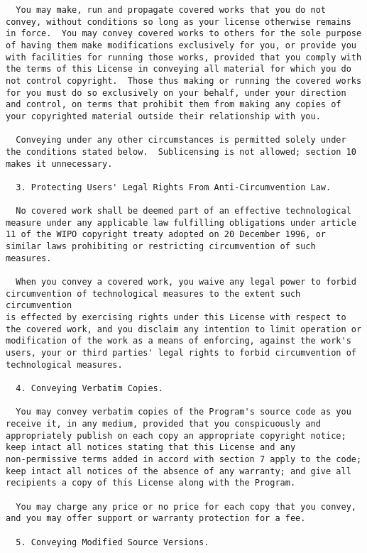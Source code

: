 \documentclass[11pt]{article}
\begin{document}
\begin{verbatim}
  You may make, run and propagate covered works that you do not
convey, without conditions so long as your license otherwise remains
in force.  You may convey covered works to others for the sole purpose
of having them make modifications exclusively for you, or provide you
with facilities for running those works, provided that you comply with
the terms of this License in conveying all material for which you do
not control copyright.  Those thus making or running the covered works
for you must do so exclusively on your behalf, under your direction
and control, on terms that prohibit them from making any copies of
your copyrighted material outside their relationship with you.

  Conveying under any other circumstances is permitted solely under
the conditions stated below.  Sublicensing is not allowed; section 10
makes it unnecessary.

  3. Protecting Users' Legal Rights From Anti-Circumvention Law.

  No covered work shall be deemed part of an effective technological
measure under any applicable law fulfilling obligations under article
11 of the WIPO copyright treaty adopted on 20 December 1996, or
similar laws prohibiting or restricting circumvention of such
measures.

  When you convey a covered work, you waive any legal power to forbid
circumvention of technological measures to the extent such circumvention
is effected by exercising rights under this License with respect to
the covered work, and you disclaim any intention to limit operation or
modification of the work as a means of enforcing, against the work's
users, your or third parties' legal rights to forbid circumvention of
technological measures.

  4. Conveying Verbatim Copies.

  You may convey verbatim copies of the Program's source code as you
receive it, in any medium, provided that you conspicuously and
appropriately publish on each copy an appropriate copyright notice;
keep intact all notices stating that this License and any
non-permissive terms added in accord with section 7 apply to the code;
keep intact all notices of the absence of any warranty; and give all
recipients a copy of this License along with the Program.

  You may charge any price or no price for each copy that you convey,
and you may offer support or warranty protection for a fee.

  5. Conveying Modified Source Versions.


\end{verbatim}
\end{document}
